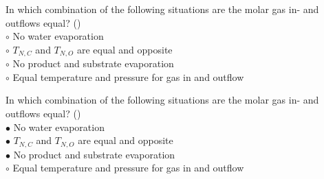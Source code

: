 \documentclass[]{beamer}
\begin{document}
\begin{frame}[shrink] {}
\addtocounter{questions}{1}
\color{blue}
In which combination of the following situations are the molar gas in- and outflows equal?  ()\\
\color{black}
\setlength{\parindent}{-0.4cm}
{\color{red}$\circ$}   No water evaporation\\
{\color{red}$\circ$} $T_{N,C}$ and $T_{N,O}$ are equal and opposite  \\
{\color{red}$\circ$} No product and substrate evaporation\\
{\color{red}$\circ$} Equal temperature and pressure for gas in and outflow    \\
\end{frame}
\begin{frame}[shrink] {}
\addtocounter{answers}{1}
\color{blue}
In which combination of the following situations are the molar gas in- and outflows equal?  ()\\
\color{black}
\setlength{\parindent}{-0.4cm}
{\color{red}$\bullet$}   No water evaporation\\
{\color{red}$\bullet$} $T_{N,C}$ and $T_{N,O}$ are equal and opposite  \\
{\color{red}$\bullet$} No product and substrate evaporation\\
{\color{red}$\circ$} Equal temperature and pressure for gas in and outflow    \\
\end{frame}
\end{document}
